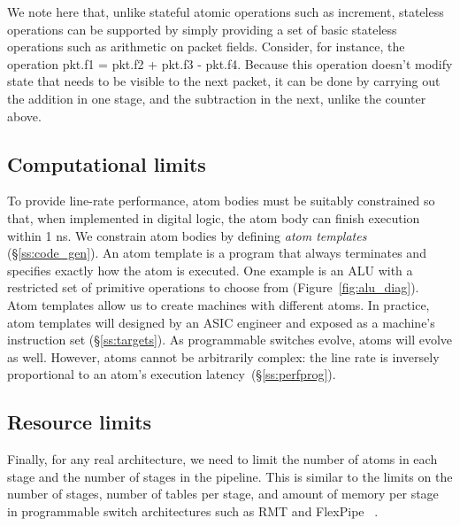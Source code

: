 We note here that, unlike stateful atomic operations such as increment,
stateless operations can be supported by simply providing a set of basic
stateless operations such as arithmetic on packet fields. Consider, for
instance, the operation pkt.f1 = pkt.f2 + pkt.f3 - pkt.f4. Because this
operation doesn't modify state that needs to be visible to the next packet, it
can be done by carrying out the addition in one stage, and the subtraction in
the next, unlike the counter above.

\subsection{Computational limits}
\label{s:atomConstraints}


To provide line-rate performance, atom bodies must be suitably constrained so
that, when implemented in digital logic, the atom body can finish execution
within 1 ns. We constrain atom bodies by defining {\it atom templates}
(\S\ref{ss:code_gen}).  An atom template is a program that always terminates
and specifies exactly how the atom is executed. One example is an ALU with a
restricted set of primitive operations to choose from
(Figure~\ref{fig:alu_diag}). Atom templates allow us to create \absmachine
machines with different atoms.  In practice, atom templates will designed by an
ASIC engineer and exposed as a machine's instruction set (\S\ref{ss:targets}).
As programmable switches evolve, atoms will evolve as well.  However, atoms
cannot be arbitrarily complex: the line rate is inversely proportional to an
atom's execution latency~(\S\ref{ss:perfprog}).

\subsection{Resource limits}
\label{s:resource}

Finally, for any real architecture, we need to limit the number of atoms in
each stage and the number of stages in the pipeline. This is similar to the
limits on the number of stages, number of tables per stage, and amount of
memory per stage in programmable switch architectures such as RMT and FlexPipe
~\cite{lavanya_compiler}.
